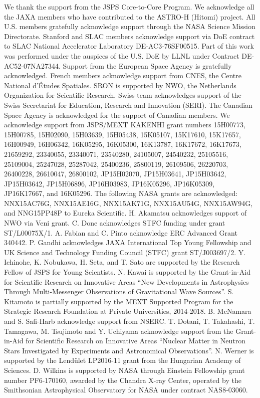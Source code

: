 We thank the support from the JSPS Core-to-Core Program.
%
We acknowledge all the JAXA members who have contributed to the ASTRO-H (Hitomi)
project.
%
All U.S. members gratefully acknowledge support through the NASA Science Mission
Directorate. Stanford and SLAC members acknowledge support via DoE contract to SLAC
National Accelerator Laboratory DE-AC3-76SF00515. Part of this work was performed under
the auspices of the U.S. DoE by LLNL under Contract DE-AC52-07NA27344.
%
Support from the European Space Agency is gratefully acknowledged.
%
French members acknowledge support from CNES, the Centre National d'\'{E}tudes Spatiales.
%
SRON is supported by NWO, the Netherlands Organization for Scientific Research.  Swiss
team acknowledges support of the Swiss Secretariat for Education, Research and
Innovation (SERI).
%
The Canadian Space Agency is acknowledged for the support of Canadian members.  
%
We acknowledge support from JSPS/MEXT KAKENHI grant numbers 15H00773, 15H00785,
15H02090, 15H03639, 15H05438, 15K05107, 15K17610, 15K17657, 16H00949, 16H06342,
16K05295, 16K05300, 16K13787, 16K17672, 16K17673, 21659292, 23340055, 23340071,
23540280, 24105007, 24540232, 25105516, 25109004, 25247028, 25287042, 25400236,
25800119, 26109506, 26220703, 26400228, 26610047, 26800102, JP15H02070, JP15H03641,
JP15H03642, JP15H03642, JP15H06896, JP16H03983, JP16K05296, JP16K05309, JP16K17667, and
16K05296.
%
The following NASA grants are acknowledged: NNX15AC76G, NNX15AE16G, NNX15AK71G,
NNX15AU54G, NNX15AW94G, and NNG15PP48P to Eureka Scientific.
%
H. Akamatsu acknowledges support of NWO via Veni grant.  
%
C. Done acknowledges STFC funding under grant ST/L00075X/1.  
%
A. Fabian and C. Pinto acknowledge ERC Advanced Grant 340442.
%
P. Gandhi acknowledges JAXA International Top Young Fellowship and UK Science and
Technology Funding Council (STFC) grant ST/J003697/2. 
%
Y. Ichinohe, K. Nobukawa, H. Seta, and T. Sato are supported by the Research Fellow of JSPS for Young
Scientists.
%
N. Kawai is supported by the Grant-in-Aid for Scientific Research on Innovative Areas
``New Developments in Astrophysics Through Multi-Messenger Observations of Gravitational
Wave Sources''.
%
S. Kitamoto is partially supported by the MEXT Supported Program for the Strategic
Research Foundation at Private Universities, 2014-2018.
%
B. McNamara and S. Safi-Harb acknowledge support from NSERC.
%
T. Dotani, T. Takahashi, T. Tamagawa, M. Tsujimoto and Y. Uchiyama acknowledge support
from the Grant-in-Aid for Scientific Research on Innovative Areas ``Nuclear Matter in
Neutron Stars Investigated by Experiments and Astronomical Observations''.
%
N. Werner is supported by the Lend\"ulet LP2016-11 grant from the Hungarian Academy of
Sciences.
%
D. Wilkins is supported by NASA through Einstein Fellowship grant number PF6-170160,
awarded by the Chandra X-ray Center, operated by the Smithsonian Astrophysical
Observatory for NASA under contract NAS8-03060.

